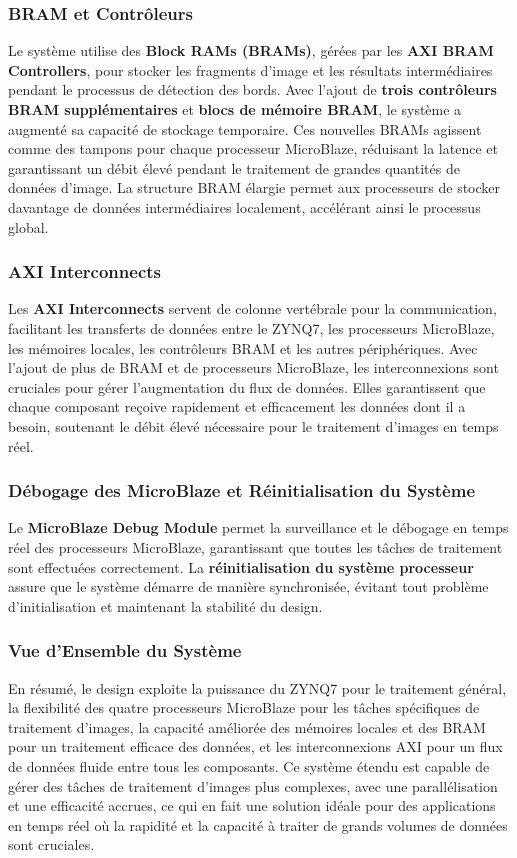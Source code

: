 \documentclass[../CSC_5RO07_TA.tex]{subfiles}
\begin{document}
\subsubsection{BRAM et Contrôleurs}  
Le système utilise des \textbf{Block RAMs (BRAMs)}, gérées par les \textbf{AXI BRAM Controllers}, pour stocker les fragments d'image et les résultats intermédiaires pendant le processus de détection des bords. Avec l'ajout de \textbf{trois contrôleurs BRAM supplémentaires} et \textbf{blocs de mémoire BRAM}, le système a augmenté sa capacité de stockage temporaire. Ces nouvelles BRAMs agissent comme des tampons pour chaque processeur MicroBlaze, réduisant la latence et garantissant un débit élevé pendant le traitement de grandes quantités de données d'image. La structure BRAM élargie permet aux processeurs de stocker davantage de données intermédiaires localement, accélérant ainsi le processus global.

\subsubsection{AXI Interconnects}  
Les \textbf{AXI Interconnects} servent de colonne vertébrale pour la communication, facilitant les transferts de données entre le ZYNQ7, les processeurs MicroBlaze, les mémoires locales, les contrôleurs BRAM et les autres périphériques. Avec l'ajout de plus de BRAM et de processeurs MicroBlaze, les interconnexions sont cruciales pour gérer l'augmentation du flux de données. Elles garantissent que chaque composant reçoive rapidement et efficacement les données dont il a besoin, soutenant le débit élevé nécessaire pour le traitement d'images en temps réel.

\subsubsection{Débogage des MicroBlaze et Réinitialisation du Système}  
Le \textbf{MicroBlaze Debug Module} permet la surveillance et le débogage en temps réel des processeurs MicroBlaze, garantissant que toutes les tâches de traitement sont effectuées correctement. La \textbf{réinitialisation du système processeur} assure que le système démarre de manière synchronisée, évitant tout problème d'initialisation et maintenant la stabilité du design.

\subsubsection{Vue d'Ensemble du Système}  
En résumé, le design exploite la puissance du ZYNQ7 pour le traitement général, la flexibilité des quatre processeurs MicroBlaze pour les tâches spécifiques de traitement d'images, la capacité améliorée des mémoires locales et des BRAM pour un traitement efficace des données, et les interconnexions AXI pour un flux de données fluide entre tous les composants. Ce système étendu est capable de gérer des tâches de traitement d'images plus complexes, avec une parallélisation et une efficacité accrues, ce qui en fait une solution idéale pour des applications en temps réel où la rapidité et la capacité à traiter de grands volumes de données sont cruciales.
\end{document}
